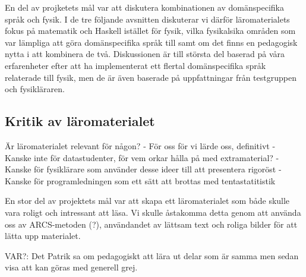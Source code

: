 \begin{binge}
En del av projketets mål var att diskutera kombinationen av
domänspecifika språk och fysik. I de tre följande avsnitten diskuterar vi därför läromaterialets fokus på matematik och Haskell istället för fysik, vilka fysikalsika områden som var lämpliga att göra domänspecifika språk till samt om det finns en pedagogisk nytta i att kombinera de två. Diskussionen är till största del baserad på våra erfarenheter efter att ha implementerat ett flertal domänspecifika språk relaterade till fysik, men de är även baserade på uppfattningar från testgruppen och fysikläraren.

\subsection{Kritik av läromaterialet}

Är läromaterialet relevant för någon?
- För oss för vi lärde oss, definitivt
- Kanske inte för datastudenter, för vem orkar hålla på med extramaterial?
- Kanske för fysiklärare som använder desse ideer till att presentera rigoröst
- Kanske för programledningen som ett sätt att brottas med tentastatitistik






En stor del av projektets mål var att skapa ett läromaterialet som både skulle
vara roligt och intressant att läsa. Vi skulle åstakomma detta genom att använda
oss av ARCS-metoden (?), användandet av lättsam text och roliga bilder för att
lätta upp materialet. 

VAR?: Det Patrik sa om pedagogiskt att lära ut delar som är samma men sedan visa att kan göras med generell grej.

\end{binge}
